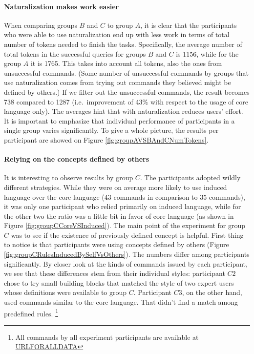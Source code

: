 \paragraph*{\textbf{Naturalization makes work easier}} When comparing groups $B$ and $C$ to group $A$, it is clear that the participants who were able to use naturalization end up with less work in terms of total number of tokens needed to finish the tasks. Specifically, the average number of total tokens in the successful queries for groups $B$ and $C$ is 1156, while for the group $A$ it is 1765. This takes into account all tokens, also the ones from unsuccessful commands. (Some number of unsuccessful commands by groups that use naturalization comes from trying out commands they believed might be defined by others.) If we filter out the unsuccessful commands, the result becomes 738 compared to 1287 (i.e.\ improvement of 43\% with respect to the usage of core language only).  The averages hint that with naturalization reduces users' effort. It is important to emphasize that individual performance of participants in a single group varies significantly. To give a whole picture, the results per participant are showed on Figure \ref{fig:groupAVSBAndCNumTokens}.
\paragraph*{\textbf{Relying on the concepts defined by others}} It is interesting to observe results by group $C$. The participants adopted wildly different strategies. While they were on average more likely to use induced language over the core language (43 commands in comparison to 35 commands), it was only one participant who relied primarily on induced language, while for the other two the ratio was a little bit in favor of core language (as shown in Figure \ref{fig:groupCCoreVSInduced}). The main point of the experiment for group $C$ was to see if the existence of previously defined concept is helpful. First thing to notice is that participants were using concepts defined by others (Figure \ref{fig:groupCRulesInducedBySelfVsOthers}). The numbers differ among participants significantly. By closer look at the kinds of commands issued by each participant, we see that these differences stem from their individual styles: participant $C2$ chose to try small building blocks that matched the style of two expert users whose definitions were available to group $C$. Participant $C3$, on the other hand, used commands similar to the core language. That didn't find a match among predefined rules. \footnote{All commands by all experiment participants are available at \url{URLFORALLDATA}}
